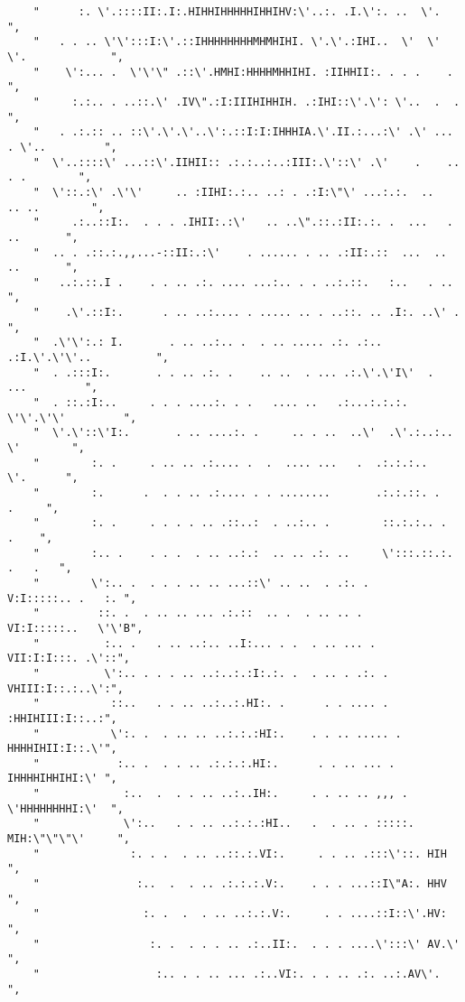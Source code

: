 \begin{lstlisting}
	"      :. \'.::::II:.I:.HIHHIHHHHHIHHIHV:\'..:. .I.\':. ..  \'.              ",
	"   . . .. \'\':::I:\'.::IHHHHHHHHMHMHIHI. \'.\'.:IHI..  \'  \'  \'.             ",
	"    \':... .  \'\'\" .::\'.HMHI:HHHHMHHIHI. :IIHHII:. . . .    .             ",
	"     :.:.. . ..::.\' .IV\".:I:IIIHIHHIH. .:IHI::\'.\': \'..  .  .            ",
	"   . .:.:: .. ::\'.\'.\'..\':.::I:I:IHHHIA.\'.II.:...:\' .\' ... . \'..         ",
	"  \'..::::\' ...::\'.IIHII:: .:.:..:..:III:.\'::\' .\'    .    ..  . .        ",
	"  \'::.:\' .\'\'     .. :IIHI:.:.. ..: . .:I:\"\' ...:.:.  ..    .. ..        ",
	"     .:..::I:.  . . . .IHII:.:\'   .. ..\".::.:II:.:. .  ...   . ..       ",
	"  .. . .::.:.,,...-::II:.:\'    . ...... . .. .:II:.::  ...  .. ..       ",
	"   ..:.::.I .    . . .. .:. .... ...:.. . . ..:.::.   :..   . ..        ",
	"    .\'.::I:.      . .. ..:.... . ..... .. . ..::. .. .I:. ..\' .         ",
	"  .\'\':.: I.       . .. ..:.. .  . .. ..... .:. .:.. .:I.\'.\'\'..          ",
	"  . .:::I:.       . . .. .:. .    .. ..  . ... .:.\'.\'I\'  .  ...         ",
	"  . ::.:I:..     . . . ....:. . .   .... ..   .:...:.:.:. \'\'.\'\'         ",
	"  \'.\'::\'I:.       . .. ....:. .     .. . ..  ..\'  .\'.:..:..    \'        ",
	"        :. .     . .. .. .:.... .  .  .... ...   .  .:.:.:..    \'.      ",
	"        :.      .  . . .. .:.... . . ........       .:.:.::. .    .     ",
	"        :. .     . . . . .. .::..:  . ..:.. .        ::.:.:.. .    .    ",
	"        :.. .    . . .  . .. ..:.:  .. .. .:. ..     \':::.::.:. .   .   ",
	"        \':.. .  . . . .. .. ...::\' .. ..  . .:. .     V:I:::::.. .   :. ",
	"         ::. .  . .. .. ... .:.::  .. .  . .. .. .     VI:I:::::..   \'\'B",
	"          :.. .   . .. ..:.. ..I:... . .  . .. ... .    VII:I:I:::. .\'::",
	"          \':.. . . . .. ..:..:.:I:.:. .  . .. . .:. .    VHIII:I::.:..\':",
	"           ::..   . . .. ..:..:.HI:. .      . . .... .   :HHIHIII:I::..:",
	"           \':. .  . .. .. ..:.:.:HI:.    . . .. ..... .   HHHHIHII:I::.\'",
	"            :.. .  . . .. .:.:.:.HI:.      . . .. ... .   IHHHHIHHIHI:\' ",
	"             :..  .  . . .. ..:..IH:.     . . .. .. ,,, . \'HHHHHHHHI:\'  ",
	"             \':..   . . .. ..:.:.:HI..   .  . .. . :::::.  MIH:\"\"\"\'     ",
	"              :. . .  . .. ..::.:.VI:.     . . .. .:::\'::. HIH          ",
	"               :..  .  . .. .:.:.:.V:.    . . . ...::I\"A:. HHV          ",
	"                :. .  .  . .. ..:.:.V:.     . . ....::I::\'.HV:          ",
	"                 :. .  . . . .. .:..II:.  . . . ....\':::\' AV.\'          ",
	"                  :.. . . .. ... .:..VI:. . . .. .:. ..:.AV\'.           ",

\end{lstlisting}
